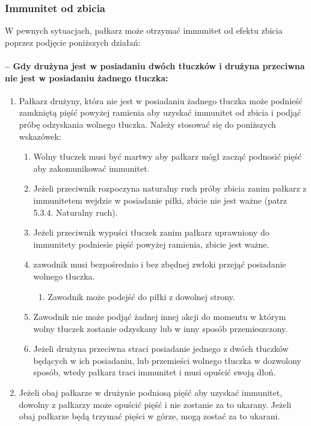 \documentclass[12pt]{article}
\begin{document}
\subsubsection{Immunitet od zbicia}

W pewnych sytuacjach, pałkarz może otrzymać immunitet od efektu zbicia
poprzez podjęcie poniższych działań:

\paragraph{-- Gdy drużyna jest w posiadaniu dwóch tłuczków i
	drużyna przeciwna nie jest w posiadaniu żadnego tłuczka:}

\begin{enumerate}
	\item
	      Pałkarz drużyny, która nie jest w posiadaniu żadnego tłuczka może
	      podnieść zamkniętą pięść powyżej ramienia aby uzyskać immunitet od
	      zbicia i podjąć próbę odzyskania wolnego tłuczka. Należy stosować się
	      do poniższych wskazówek:

	      \begin{enumerate}
		      \item
		            Wolny tłuczek musi być martwy aby pałkarz mógł zacząć podnosić pięść
		            aby zakomunikować immunitet.
		      \item
		            Jeżeli przeciwnik rozpoczyna naturalny ruch próby zbicia zanim
		            pałkarz z immunitetem wejdzie w posiadanie piłki, zbicie nie jest
		            ważne (patrz 5.3.4. Naturalny ruch).
		      \item
		            Jeżeli przeciwnik wypuści tłuczek zanim pałkarz uprawniony do
		            immunitety podniesie pięść powyżej ramienia, zbicie jest ważne.
		      \item
		            zawodnik musi bezpośrednio i bez zbędnej zwłoki przejąć posiadanie
		            wolnego tłuczka.

		            \begin{enumerate}
			            \item
			                  Zawodnik może podejść do piłki z dowolnej strony.
		            \end{enumerate}
		      \item
		            Zawodnik nie może podjąć żadnej innej akcji do momentu w którym
		            wolny tłuczek zostanie odzyskany lub w inny sposób przemieszczony.
		      \item
		            Jeżeli drużyna przeciwna straci posiadanie jednego z dwóch tłuczków
		            będących w ich posiadaniu, lub przemieści wolnego tłuczka w
		            dozwolony sposób, wtedy pałkarz traci immunitet i musi opuścić swoją
		            dłoń.
	      \end{enumerate}
	\item
	      Jeżeli obaj pałkarze w drużynie podniosą pięść aby uzyskać immunitet,
	      dowolny z pałkarzy może opuścić pięść i nie zostanie za to ukarany.
	      Jeżeli obaj pałkarze będą trzymać pięści w górze, mogą zostać za to
	      ukarani.
\end{enumerate}
\end{document}
